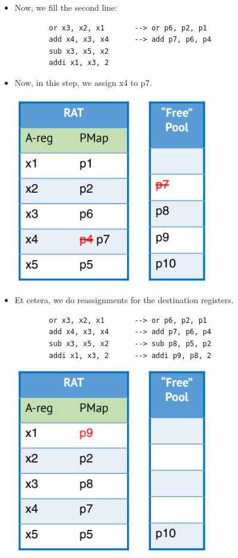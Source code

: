 \documentclass[10pt]{article}
\begin{document}
\begin{itemize}
\begin{center}
    \end{center}
    \item Now, we fill the second line:
    \begin{verbatim}
        or x3, x2, x1       --> or p6, p2, p1
        add x4, x3, x4      --> add p7, p6, p4
        sub x3, x5, x2
        addi x1, x3, 2
    \end{verbatim}
    \item Now, in this step, we assign x4 to p7.
    \begin{center}
        \includegraphics[scale=0.9]{W5_5.png}
    \end{center}
    \item Et cetera, we do reassignments for the destination registers.
    \begin{verbatim}
        or x3, x2, x1       --> or p6, p2, p1
        add x4, x3, x4      --> add p7, p6, p4
        sub x3, x5, x2      --> sub p8, p5, p2
        addi x1, x3, 2      --> addi p9, p8, 2
    \end{verbatim}
    \begin{center}
        \includegraphics[scale=0.9]{W5_6.png}
    \end{center}
\end{itemize}
\end{document}

